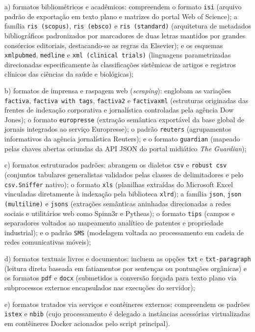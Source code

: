 \documentclass[
	oneside,
	a4paper,
	12pt,
	chapter=TITLE,
	section=TITLE,
	english,
	brazilian
]{abntex2}
\begin{document}
\begin{apendicesenv}
\par\indent a) formatos bibliométricos e acadêmicos: compreendem o formato \texttt{isi} (arquivo padrão de exportação em texto plano e matrizes do portal Web of Science); a família \texttt{ris (scopus)}, \texttt{ris (ebsco)} e \texttt{ris (standard)} (arquitetura de metadados bibliográficos padronizados por marcadores de duas letras mantidos por grandes consórcios editoriais, destacando-se as regras da Elsevier); e os esquemas \texttt{xmlpubmed}, \texttt{medline} e \texttt{xml (clinical trials)} (linguagens parametrizadas direcionadas especificamente às classificações sistêmicas de artigos e registros clínicos das ciências da saúde e biológicas);
\par\indent b) formatos de imprensa e raspagem web (\textit{scraping}): englobam as variações \texttt{factiva}, \texttt{factiva with tags}, \texttt{factiva2} e \texttt{factivaxml} (estruturas originadas das frentes de indexação corporativa e jornalística controladas pela agência Dow Jones); o formato \texttt{europresse} (extração semântica exportável da base global de jornais integrados ao serviço Europresse); o padrão \texttt{reuters} (agrupamentos informativos da agência jornalística Reuters); e o formato \texttt{guardian} (mapeado pelas chaves abertas oriundas da API JSON do portal midiático \textit{The Guardian});
\par\indent c) formatos estruturados padrões: abrangem os dialetos \texttt{csv} e \texttt{robust csv} (conjuntos tabulares generalistas validados pelas classes de delimitadores e pelo \texttt{csv.\allowbreak Sniffer} nativo); o formato \texttt{xls} (planilhas extraídas do Microsoft Excel vinculadas diretamente à indexação pela biblioteca \texttt{xlrd}); a família \texttt{json}, \texttt{json (multiline)} e \texttt{jsons} (extrações semânticas aninhadas direcionadas a redes sociais e utilitários web como Spinn3r e Pytheas); o formato \texttt{tips} (campos e separadores voltados ao mapeamento analítico de patentes e propriedade industrial); e o padrão \texttt{SMS} (modelagem voltada ao processamento em cadeia de redes comunicativas móveis);
\par\indent d) formatos textuais livres e documentos: incluem as opções \texttt{txt} e \texttt{txt-paragraph} (leitura direta baseada em fatiamentos por sentenças ou pontuações orgânicas) e os formatos \texttt{pdf} e \texttt{docx} (submetidos a conversão forçada para texto plano via subprocessos externos encapsulados nas execuções do servidor);
\par\indent e) formatos tratados via serviços e contêineres externos: compreendem os padrões \texttt{istex} e \texttt{nbib} (cujo processamento é delegado a instâncias acessórias virtualizadas em contêineres Docker acionados pelo script principal).

\end{apendicesenv}
\end{document}
